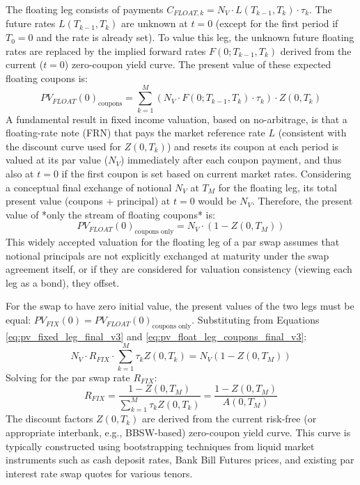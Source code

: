 \documentclass[11pt, a4paper, british]{article}
\begin{document}
The floating leg consists of payments $C_{FLOAT,k} = N_V \cdot L(T_{k-1}, T_k) \cdot \tau_k$. The future rates $L(T_{k-1}, T_k)$ are unknown at $t=0$ (except for the first period if $T_0=0$ and the rate is already set). To value this leg, the unknown future floating rates are replaced by the implied forward rates $F(0; T_{k-1}, T_k)$ derived from the current ($t=0$) zero-coupon yield curve. The present value of these expected floating coupons is:
\begin{equation}
 PV_{FLOAT}(0)_{\text{coupons}} = \sum_{k=1}^{M} (N_V \cdot F(0; T_{k-1}, T_k) \cdot \tau_k) \cdot Z(0, T_k)
 \label{eq:pv_float_leg_forwards_final_v3}
\end{equation}
A fundamental result in fixed income valuation, based on no-arbitrage, is that a floating-rate note (FRN) that pays the market reference rate $L$ (consistent with the discount curve used for $Z(0, T_k)$) and resets its coupon at each period is valued at its par value ($N_V$) immediately after each coupon payment, and thus also at $t=0$ if the first coupon is set based on current market rates. Considering a conceptual final exchange of notional $N_V$ at $T_M$ for the floating leg, its total present value (coupons + principal) at $t=0$ would be $N_V$. Therefore, the present value of *only the stream of floating coupons* is:
\begin{equation}
 PV_{FLOAT}(0)_{\text{coupons only}} = N_V \cdot (1 - Z(0, T_M))
 \label{eq:pv_float_leg_coupons_final_v3}
\end{equation}
This widely accepted valuation for the floating leg of a par swap assumes that notional principals are not explicitly exchanged at maturity under the swap agreement itself, or if they are considered for valuation consistency (viewing each leg as a bond), they offset.

For the swap to have zero initial value, the present values of the two legs must be equal: $PV_{FIX}(0) = PV_{FLOAT}(0)_{\text{coupons only}}$. Substituting from Equations \ref{eq:pv_fixed_leg_final_v3} and \ref{eq:pv_float_leg_coupons_final_v3}:
\begin{equation}
 N_V \cdot R_{FIX} \cdot \sum_{k=1}^{M} \tau_k Z(0, T_k) = N_V (1 - Z(0, T_M))
\end{equation}
Solving for the par swap rate $R_{FIX}$:
\begin{equation}
 R_{FIX} = \frac{1 - Z(0, T_M)}{\sum_{k=1}^{M} \tau_k Z(0, T_k)} = \frac{1 - Z(0, T_M)}{A(0, T_M)}
 \label{eq:par_swap_rate_rigorous_final_v3}
\end{equation}
The discount factors $Z(0, T_k)$ are derived from the current risk-free (or appropriate interbank, e.g., BBSW-based) zero-coupon yield curve. This curve is typically constructed using bootstrapping techniques from liquid market instruments such as cash deposit rates, Bank Bill Futures prices, and existing par interest rate swap quotes for various tenors.
\end{document}
